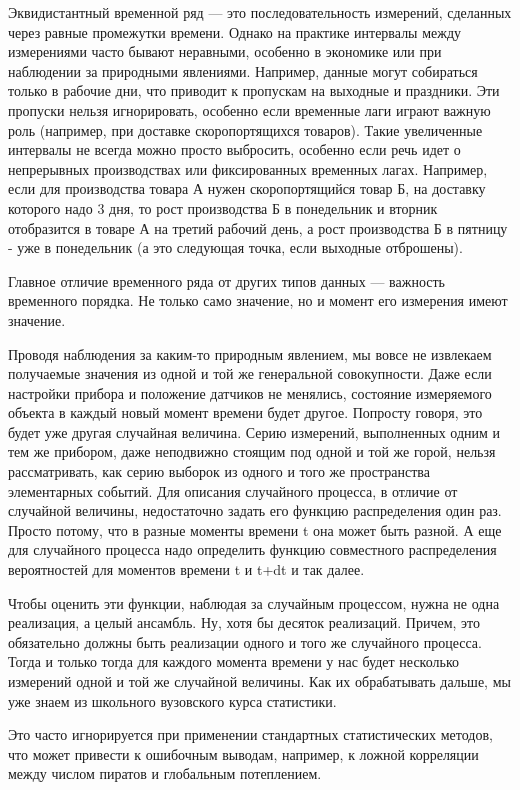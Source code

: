 Эквидистантный временной ряд — это последовательность измерений,
сделанных через равные промежутки времени. Однако на практике
интервалы между измерениями часто бывают неравными, особенно в
экономике или при наблюдении за природными явлениями. Например,
данные могут собираться только в рабочие дни, что приводит к
пропускам на выходные и праздники. Эти пропуски нельзя
игнорировать, особенно если временные лаги играют важную роль
(например, при доставке скоропортящихся товаров).
Такие увеличенные интервалы не всегда можно просто выбросить, особенно
если речь идет о непрерывных производствах или фиксированных временных лагах.
Например, если для производства товара А нужен скоропортящийся
товар Б, на доставку которого надо 3 дня, то рост производства Б в
понедельник и вторник отобразится в товаре А на третий рабочий
день, а рост производства Б в пятницу - уже в понедельник (а это
следующая точка, если выходные отброшены).

Главное отличие временного ряда от других типов данных — важность
временного порядка. Не только само значение, но и момент его
измерения имеют значение.

Проводя наблюдения за
каким-то природным явлением, мы вовсе не извлекаем получаемые
значения из одной и той же генеральной совокупности. Даже если
настройки прибора и положение датчиков не менялись, состояние
измеряемого объекта в каждый новый момент времени будет другое.
Попросту говоря, это будет уже другая случайная величина. Серию
измерений, выполненных одним и тем же прибором, даже неподвижно
стоящим под одной и той же горой, нельзя рассматривать, как серию
выборок из одного и того же пространства элементарных событий. Для
описания случайного процесса, в отличие от случайной величины,
недостаточно задать его функцию
распределения один раз. Просто потому, что в разные моменты времени
t она может быть разной. А еще для случайного процесса надо
определить функцию совместного распределения вероятностей для
моментов времени t и t+dt и так далее.

Чтобы оценить эти функции,
наблюдая за случайным процессом, нужна не одна реализация, а целый
ансамбль. Ну, хотя бы десяток реализаций. Причем, это обязательно
должны быть реализации одного и того же случайного процесса. Тогда
и только тогда для каждого момента времени у нас будет несколько
измерений одной и той же случайной величины. Как их обрабатывать
дальше, мы уже знаем из школьного вузовского курса статистики.

Это часто игнорируется при применении
стандартных статистических методов, что может привести к ошибочным
выводам, например, к ложной корреляции между числом пиратов и
глобальным потеплением.

